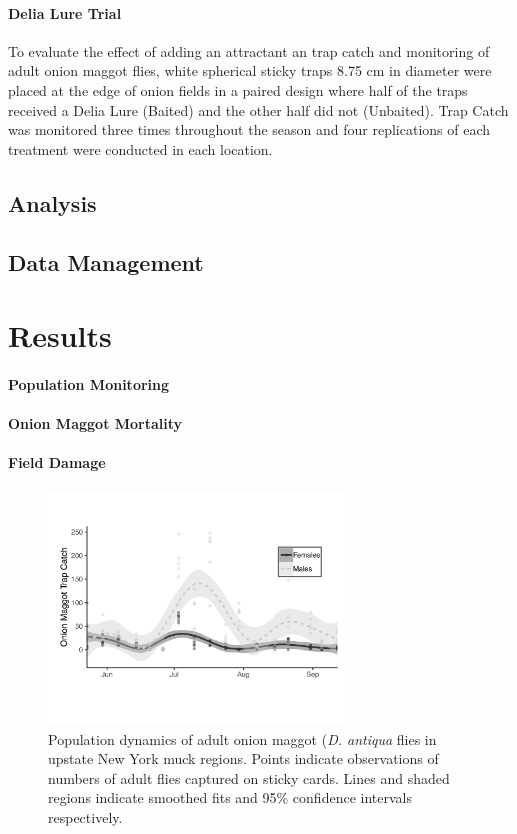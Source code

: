 \documentclass[alpha-refs]{wiley-article}
\begin{document}
\paragraph{Delia Lure Trial}
To evaluate the effect of adding an attractant an trap catch and monitoring of adult onion maggot flies, white spherical sticky traps 8.75 cm in diameter were placed at the edge of onion fields in a paired design where half of the traps received a Delia Lure (Baited) and the other half did not (Unbaited).  Trap Catch was monitored three times throughout the season and four replications of each treatment were conducted in each location.  


\subsection{Analysis}
\subsection{Data Management}


\section{Results}

\paragraph{Population Monitoring}

\paragraph{Onion Maggot Mortality}

\paragraph{Field Damage}



\begin{figure}[bt]
\centering
\includegraphics[width = 8cm]{figures/final-figures/figure-1.pdf}
\caption{Population dynamics of adult onion maggot (\textit{D. antiqua} flies in upstate New York muck regions.  Points indicate observations of numbers of adult flies captured on sticky cards.  Lines and shaded regions indicate smoothed fits and 95\% confidence intervals respectively.  }
\label{fig:figure1}
\end{figure}
\end{document}
